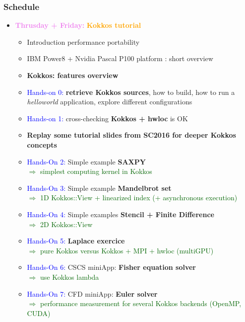 \begin{frame}
  \frametitle{Schedule}

  \begin{itemize}
  \item {\bf \textcolor{violet}{Thrusday + Friday:}} \textcolor{orange}{\bf Kokkos tutorial}
    \begin{itemize}
    \item Introduction performance portability
    \item IBM Power8 + Nvidia Pascal P100 platform : short overview
    \item \textbf{Kokkos: features overview}
    \item \textcolor{blue}{Hands-on 0:} \textbf{retrieve Kokkos sources}, how to build, how to run a \textit{helloworld} application, explore different configurations
    \item \textcolor{blue}{Hands-on 1:} cross-checking \textbf{Kokkos + hwloc} is OK
    \item \textbf{Replay some tutorial slides from SC2016 for deeper Kokkos concepts}
    \item \textcolor{blue}{Hands-On 2:} Simple example \textbf{SAXPY}\\
      \textcolor{darkgreen}{$\Rightarrow$ simplest computing kernel in Kokkos}
    \item \textcolor{blue}{Hands-On 3:} Simple example \textbf{Mandelbrot set}\\
      \textcolor{darkgreen}{$\Rightarrow$ 1D Kokkos::View + linearized index (+ asynchronous execution)}
    \item \textcolor{blue}{Hands-On 4:} Simple examples \textbf{Stencil + Finite Difference}\\
      \textcolor{darkgreen}{$\Rightarrow$ 2D Kokkos::View}
    \item \textcolor{blue}{Hands-On 5:} \textbf{Laplace exercice}\\
      \textcolor{darkgreen}{$\Rightarrow$ pure Kokkos versus Kokkos + MPI + hwloc (multiGPU)}
    \item \textcolor{blue}{Hands-On 6:} CSCS miniApp: \textbf{Fisher equation solver}\\
      \textcolor{darkgreen}{$\Rightarrow$ use Kokkos lambda}
    \item \textcolor{blue}{Hands-On 7:} CFD miniApp: \textbf{Euler solver}\\
      \textcolor{darkgreen}{$\Rightarrow$ performance measurement for several Kokkos backends (OpenMP, CUDA)}
    \end{itemize}
  \end{itemize}

\end{frame}
